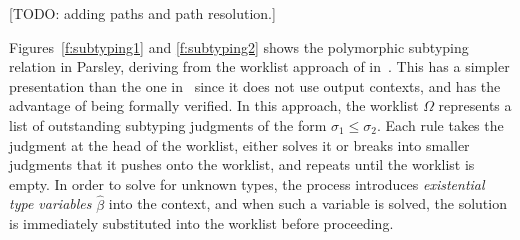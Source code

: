 \documentclass[letterpaper]{article}
\newcommand{\todo}[1]{{\color{red}[TODO: #1]}}
\newcommand{\etv}{\widehat{\beta}}    %
\begin{document}
\todo{adding paths and path resolution.}

Figures~\ref{f:subtyping1} and \ref{f:subtyping2} shows the
polymorphic subtyping relation in Parsley, deriving from the worklist
approach of in~\cite{zhao2018,zhao19:bidir}.  This has a simpler
presentation than the one in~\cite{Dunfield13:bidir} since it does not
use output contexts, and has the advantage of being formally verified.
In this approach, the worklist $\Omega$ represents a list of
outstanding subtyping judgments of the form $\sigma_1\leq\sigma_2$.
Each rule takes the judgment at the head of the worklist, either
solves it or breaks into smaller judgments that it pushes onto the
worklist, and repeats until the worklist is empty.  In order to solve
for unknown types, the process introduces {\em existential type
  variables} $\etv$ into the context, and when such a variable is
solved, the solution is immediately substituted into the worklist
before proceeding.
\end{document}
